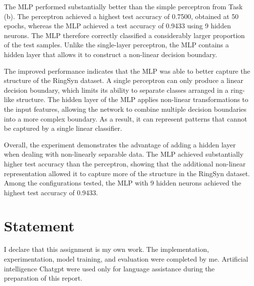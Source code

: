 \documentclass[a4paper,12pt]{article}
\begin{document}
The MLP performed substantially better than the simple perceptron from Task (b). The perceptron achieved a highest test accuracy of 0.7500, obtained at 50 epochs, whereas the MLP achieved a test accuracy of 0.9433 using 9 hidden neurons. The MLP therefore correctly classified a considerably larger proportion of the test samples. Unlike the single-layer perceptron, the MLP contains a hidden layer that allows it to construct a non-linear decision boundary.

The improved performance indicates that the MLP was able to better capture the structure of the RingSyn dataset. A single perceptron can only produce a linear decision boundary, which limits its ability to separate classes arranged in a ring-like structure. The hidden layer of the MLP applies non-linear transformations to the input features, allowing the network to combine multiple decision boundaries into a more complex boundary. As a result, it can represent patterns that cannot be captured by a single linear classifier.

Overall, the experiment demonstrates the advantage of adding a hidden layer when dealing with non-linearly separable data. The MLP achieved substantially higher test accuracy than the perceptron, showing that the additional non-linear representation allowed it to capture more of the structure in the RingSyn dataset. Among the configurations tested, the MLP with 9 hidden neurons achieved the highest test accuracy of 0.9433.

\section*{Statement}

I declare that this assignment is my own work. The implementation, experimentation, model training, and evaluation were completed by me. Artificial intelligence Chatgpt\cite{chatgpt2026} were used only for language assistance during the preparation of this report.


\end{document}
